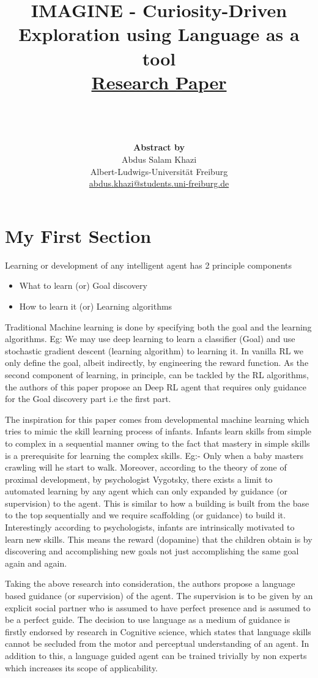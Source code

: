 \documentclass[10pt]{article}
\title{IMAGINE - Curiosity-Driven Exploration using Language as a tool\\
        \href{https://arxiv.org/pdf/2002.09253.pdf}
                        {Research Paper}}
\author{
                \\
                \\
                \\
                \textbf{Abstract by}\\
                Abdus Salam Khazi\\
                Albert-Ludwigs-Universität Freiburg\\
                \href{mailto:abdus.khazi@students.uni-freiburg.de}
                       {abdus.khazi@students.uni-freiburg.de}
}
\date{}
\begin{document}
\maketitle

\newpage

\section{My First Section}

Learning or development of any intelligent agent has 2 principle components
\begin{itemize}
  \item What to learn (or) Goal discovery
  \item How to learn it (or) Learning algorithms
\end{itemize}
Traditional Machine learning is done by specifying both the goal and the learning algorithms.  Eg: We may use deep learning to learn a classifier (Goal) and use stochastic gradient descent (learning algorithm) to learning it.  In vanilla RL we only define the goal, albeit indirectly, by engineering the reward function.
As the second component of learning, in principle, can be tackled by the RL algorithms,
the authors of this paper propose an Deep RL agent that requires only guidance for the Goal discovery part i.e the first part.

The inspiration for this paper comes from developmental machine learning which tries to mimic the skill learning process of infants.
Infants learn skills from simple to complex in a sequential manner owing to the fact that mastery in simple skills is a prerequisite for learning the complex skills. Eg:- Only when a baby masters crawling will he start to walk.
Moreover, according to the theory of zone of proximal development, by psychologist Vygotsky, there exists a limit to automated learning by any agent which can only expanded by guidance (or supervision) to the agent.
This is similar to how a building is built from the base to the top sequentially and we require scaffolding (or guidance) to build it.
Interestingly according to psychologists, infants are intrinsically motivated to learn new skills. This means the reward (dopamine) that the children obtain is by discovering and accomplishing new goals not just accomplishing the same goal again and again.

Taking the above research into consideration,  the authors propose a language based guidance (or supervision) of the agent. 
The supervision is to be given by an explicit social partner who is assumed to have perfect presence and is assumed to be a perfect guide.
The decision to use language as a medium of guidance is firstly endorsed by research in Cognitive science, which states that language skills cannot be secluded from the motor and perceptual understanding of an agent.
In addition to this, a language guided agent can be trained trivially by non experts which increases its scope of applicability.
\end{document}
